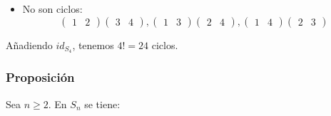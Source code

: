 \documentclass[11pt,a4paper]{article}
\begin{document}
\begin{itemize}
\item No son ciclos:
\begin{equation*}
\begin{pmatrix}
1 & 2
\end{pmatrix}
\begin{pmatrix}
3 & 4
\end{pmatrix}
,
\begin{pmatrix}
1 & 3
\end{pmatrix}
\begin{pmatrix}
2 & 4
\end{pmatrix}
,
\begin{pmatrix}
1 & 4
\end{pmatrix}
\begin{pmatrix}
2 & 3
\end{pmatrix}
\end{equation*}
\end{itemize}

Añadiendo $id_{S_{4}}$, tenemos $4! = 24$ ciclos.


\subsubsection*{Proposición}

Sea $n \geq 2$. En $S_{n}$ se tiene:
\end{document}
